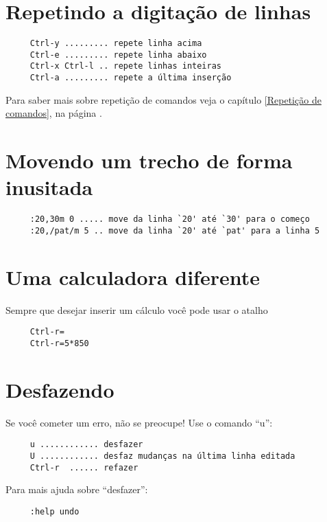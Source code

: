 \section{Repetindo a digitação de linhas}
\label{Repetindo a digitação de linhas}

\begin{verbatim}
     Ctrl-y ......... repete linha acima
     Ctrl-e ......... repete linha abaixo
     Ctrl-x Ctrl-l .. repete linhas inteiras
     Ctrl-a ......... repete a última inserção
\end{verbatim}

Para saber mais sobre repetição de comandos veja o capítulo \ref{Repetição de comandos},
na página \pageref{Repetição de comandos}.

\section{Movendo um trecho de forma inusitada}
\label{Movendo um trecho de forma inusitada}

\begin{verbatim}
     :20,30m 0 ..... move da linha `20' até `30' para o começo
     :20,/pat/m 5 .. move da linha `20' até `pat' para a linha 5
\end{verbatim}


\section{Uma calculadora diferente}
\label{Uma calculadora diferente}
Sempre que desejar inserir um cálculo você pode usar o atalho

\begin{verbatim}
     Ctrl-r=
     Ctrl-r=5*850
\end{verbatim}


\section{Desfazendo}
\label{Desfazendo}

Se você cometer um erro, não se preocupe! Use o comando ``u'':

\begin{verbatim}
     u ............ desfazer
     U ............ desfaz mudanças na última linha editada
     Ctrl-r  ...... refazer
\end{verbatim}

Para mais ajuda sobre ``desfazer'':

\begin{verbatim}
     :help undo
\end{verbatim}


